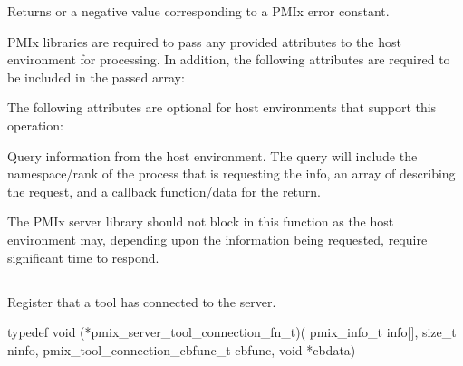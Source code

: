 Returns  or a negative value corresponding to a PMIx error constant.

\reqattrstart
\ac{PMIx} libraries are required to pass any provided attributes to the host environment for processing. In addition, the following attributes are required to be included in the passed  array:


\reqattrend


\optattrstart
The following attributes are optional for host environments that support this operation:


\optattrend
\descr

Query information from the host environment.
The query will include the namespace/rank of the process that is requesting the info, an array of  describing the request, and a callback function/data for the return.

\adviceimplstart
The \ac{PMIx} server library should not block in this function as the host environment may, depending upon the information being requested, require significant time to respond.
\adviceimplend



\subsection{}

\summary

Register that a tool has connected to the server.

\format

\cspecificstart
\begin{codepar}
typedef void (*pmix_server_tool_connection_fn_t)(
                             pmix_info_t info[], size_t ninfo,
                             pmix_tool_connection_cbfunc_t cbfunc,
                             void *cbdata)
\end{codepar}
\cspecificend

